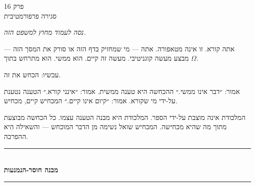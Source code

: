 \documentclass[10pt, openany, oneside]{book}
\renewcommand{\normalsize}{\fontsize{10}{13}\selectfont}
\renewcommand{\large}{\fontsize{11.5}{14}\selectfont}
\renewcommand{\huge}{\fontsize{17}{21}\selectfont}
\begin{document}
%
%
%

\newpage

\begin{center}
    {\huge\textsc{פרק 16}}\\[0.3em]
    {\large\textsc{סגירה פרפורמטיבית}}
\end{center}

\vspace{1.5em}

\begin{center}
    \textit{%
    נסה לעמוד מחוץ למשפט הזה.}
\end{center}

\vspace{2em}


\noindent אתה קורא. זו אינה מטאפורה. אתה — מי שמחזיק בדף הזה או סורק את המסך הזה — מבצע מעשה קוגניטיבי. מעשה זה קיים. הוא ממשי. הוא מתרחש בתוך $\Omega$.

עכשיו: הכחש את זה.

אמור: ״דבר אינו ממשי.״ ההכחשה היא טענה ממשית. אמור: ״אינני קורא.״ הטענה נטענת על-ידי מי שקורא. אמור: ״קיום אינו קיים.״ המכחיש קיים, מכחיש.

המלכודת אינה מוצבת על-ידי הספר. המלכודת היא מבנה הטענה עצמו. כל הכחשה מבוצעת מתוך מה שהיא מכחישה. המכחיש שואל נשימה מן הדבר המוכחש — והשאילה הִיא ההפרכה.

\vspace{1.5em}


\begin{center}
    \rule{0.3\textwidth}{0.4pt}\\[0.5em]
    {\normalsize\bfseries\textsc{מבנה חוסר-הנמנעות}}\\[0.3em]
    \rule{0.3\textwidth}{0.4pt}
\end{center}

\vspace{1em}
\end{document}
